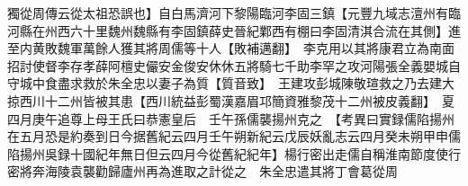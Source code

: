 獨從周傳云從太祖恐誤也】自白馬濟河下黎陽臨河李固三鎮【元豐九域志澶州有臨河縣在州西六十里魏州魏縣有李固鎮薛史晉紀鄴西有棚曰李固清淇合流在其側】進至内黄敗魏軍萬餘人獲其將周儒等十人【敗補邁翻】　李克用以其將康君立為南面招討使督李存孝薛阿檀史儼安金俊安休休五將騎七千助李罕之攻河陽張全義嬰城自守城中食盡求救於朱全忠以妻子為質【質音致】　王建攻彭城陳敬瑄救之乃去建大掠西川十二州皆被其患【西川統益彭蜀漢嘉眉邛簡資雅黎茂十二州被皮義翻】　夏四月庚午追尊上母王氏曰恭憲皇后　壬午孫儒襲揚州克之　【考異曰實録儒陷揚州在五月恐是約奏到日今据舊紀云四月壬午朔新紀云戊辰妖亂志云四月癸未朔甲申儒陷揚州吳録十國紀年無日但云四月今從舊紀紀年】楊行密出走儒自稱淮南節度使行密將奔海陵袁襲勸歸廬州再為進取之計從之　朱全忠遣其將丁會葛從周